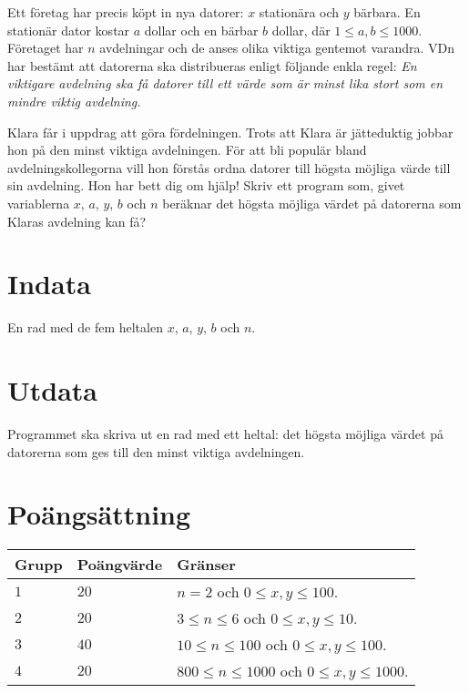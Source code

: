 
Ett företag har precis köpt in nya datorer: $x$ stationära och $y$
bärbara. En stationär dator kostar $a$ dollar och en bärbar $b$
dollar, där $1\le a,b \le 1000$. Företaget har $n$ avdelningar och de
anses olika viktiga gentemot varandra. VDn har bestämt att datorerna
ska distribueras enligt följande enkla regel: {\em En viktigare avdelning ska få datorer till ett värde som är minst lika stort som en mindre viktig avdelning.}

Klara får i uppdrag att göra fördelningen. Trots att Klara är jätteduktig jobbar hon på den minst viktiga avdelningen. För att bli populär bland avdelningskollegorna vill hon förstås ordna datorer till högsta möjliga värde till sin avdelning. 
Hon har bett dig om hjälp! Skriv ett program som, givet variablerna $x$, $a$, $y$, $b$ och $n$ beräknar det högsta möjliga värdet på datorerna som Klaras avdelning kan få?


\section*{Indata}
En rad med de fem heltalen $x$, $a$, $y$, $b$ och $n$.

\section*{Utdata}

Programmet ska skriva ut en rad med ett heltal: det högsta möjliga värdet på datorerna som ges till den minst viktiga avdelningen.

\section*{Poängsättning}
\begin{tabular}{| l | l | l |}
    \hline
      Grupp & Poängvärde & Gränser \\ \hline
      $1$    & $20$       &  $n=2$ och $0\le x,y \le 100$.\\ \hline 
      $2$    & $20$       &  $3\le n\le 6$ och $0\le x,y \le 10$. \\ \hline 
      $3$    & $40$       &  $10\le n\le 100$ och $0\le x,y \le 100$.\\ \hline 
      $4$    & $20$       &  $800\le n\le 1000$ och $0\le x,y \le 1000$. \\ \hline
\end{tabular}
